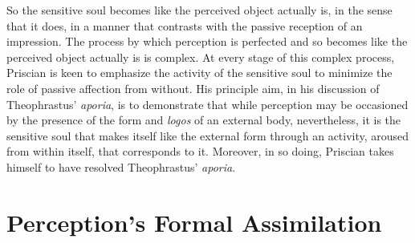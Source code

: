 \documentclass[12pt]{article}
\begin{document}
So the sensitive soul becomes like the perceived object actually is, in the sense that it does, in a manner that contrasts with the passive reception of an impression. The process by which perception is perfected and so becomes like the perceived object actually is is complex. At every stage of this complex process, Priscian is keen to emphasize the activity of the sensitive soul to minimize the role of passive affection from without. His principle aim, in his discussion of Theophrastus' \emph{aporia}, is to demonstrate that while perception may be occasioned by the presence of the form and \emph{logos} of an external body, nevertheless, it is the sensitive soul that makes itself like the external form through an activity, aroused from within itself, that corresponds to it. Moreover, in so doing, Priscian takes himself to have resolved Theophrastus' \emph{aporia}.


\section{Perception's Formal Assimilation} %
\label{sec:perception_s_formal_assimilation}
\end{document}
